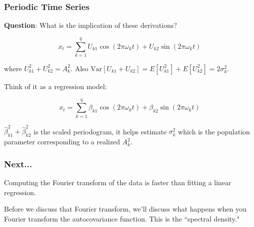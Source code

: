 \documentclass[%
xcolor=pdftex]{beamer}
\begin{document}
\begin{frame}
\frametitle{Periodic Time Series}

\textbf{Question}: What is the implication of these derivations?
\pause

\begin{equation}
x_t = \sum_{k=1}^{q} U_{k1} \cos(2 \pi \omega_k t) + U_{k2} \sin(2 \pi \omega_k t)
\end{equation}

where $U_{k1}^2 + U_{k2}^2 = A_k^2$. Also $\text{Var}[U_{k1} + U_{k2}] = E[U_{k1}^2] + E[U_{k2}^2] = 2 \sigma_k^2$. 
\pause

Think of it as a regression model:

\begin{equation}
x_t = \sum_{k=1}^{q} \beta_{k1} \cos(2 \pi \omega_k t) + \beta_{k2} \sin(2 \pi \omega_k t)
\end{equation}

$\hat{\beta}_{k1}^2 + \hat{\beta}_{k2}^2$ is the scaled periodogram, it helps estimate $\sigma^2_k$ which is the population parameter corresponding to a realized $A_k^2$.


\end{frame}


\begin{frame}
\frametitle{Next...}

Computing the Fourier transform of the data is faster than fitting a linear regression. 
\newline

Before we discuss that Fourier transform, we'll discuss what happens when you Fourier transform the autocovariance function. This is the ``spectral density."


\end{frame}
\end{document}
